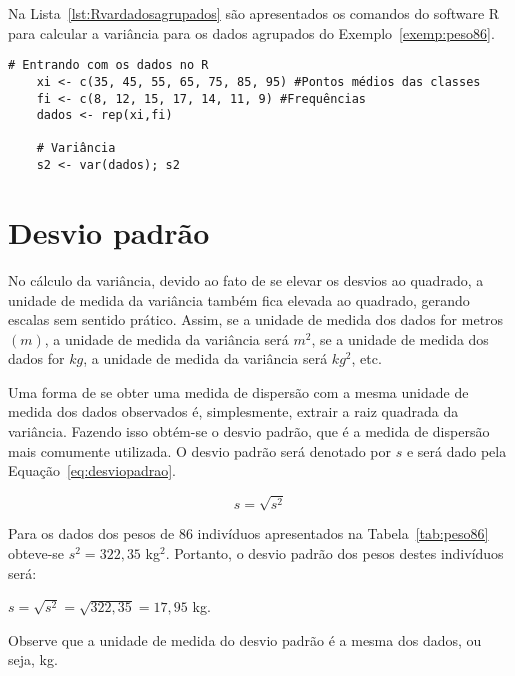 \documentclass[11pt,fleqn]{book} %
\begin{document}
Na Lista~\ref{lst:Rvardadosagrupados} são apresentados os comandos do software R para calcular a variância para os dados agrupados do Exemplo~\ref{exemp:peso86}. \\

\begin{scriptsize}
	\estiloR
	\begin{lstlisting}[caption={Comandos do software R}, label=lst:Rvardadosagrupados]
	# Entrando com os dados no R
	xi <- c(35, 45, 55, 65, 75, 85, 95) #Pontos médios das classes
	fi <- c(8, 12, 15, 17, 14, 11, 9) #Frequências
	dados <- rep(xi,fi)
	
	# Variância
	s2 <- var(dados); s2

	\end{lstlisting}
\end{scriptsize}





\section{Desvio padrão}

No cálculo da variância, devido ao fato de se elevar os desvios ao quadrado, a unidade de medida da variância também fica elevada ao quadrado, gerando escalas sem sentido prático. Assim, se a unidade de medida dos dados for metros $(m)$, a unidade de medida da variância será $m^2$, se a unidade de medida dos dados for $kg$, a unidade de medida da variância será $kg^2$, etc.

Uma forma de se obter uma medida de dispersão com a mesma unidade de medida dos dados observados é, simplesmente, extrair a raiz quadrada da variância. Fazendo isso obtém-se o desvio padrão, que é a medida de dispersão mais comumente utilizada. O desvio padrão será denotado por $s$ e será dado pela Equação~\ref{eq:desviopadrao}. \\

\begin{eBox}
\vspace{-0.5cm}
\begin{equation} \label{eq:desviopadrao}
s=\sqrt{s^2} 
\end{equation}
\end{eBox}

\vspace{0,3cm}

\begin{example}

Para os dados dos pesos de 86 indivíduos apresentados na Tabela~\ref{tab:peso86} obteve-se $s^2=322,35$ kg$^2$. Portanto, o desvio padrão dos pesos destes indivíduos será:

\begin{center}
$\displaystyle s=\sqrt{s^2}=\sqrt{322,35}=17,95$ kg.
\end{center}

Observe que a unidade de medida do desvio padrão é a mesma dos dados, ou seja, kg.


\end{example}
\end{document}

